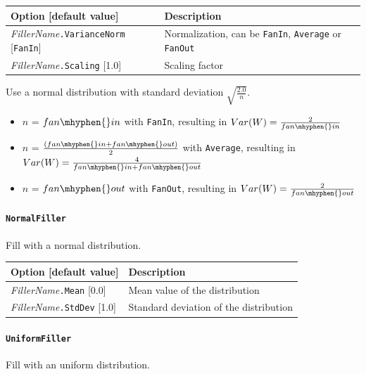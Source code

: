 \documentclass[a4paper,11pt,oneside]{article}
\newenvironment{myitemize}
{ \begin{itemize}
    \setlength{\itemsep}{0pt}
    \setlength{\parskip}{0pt}
    \setlength{\parsep}{0pt}     }
{ \end{itemize}                  }
\begin{document}
\begin{center}
 \begin{tabular}{| p{5cm} | p{10cm} | }
 \hline
 Option [default value] & Description\\
 \hline\hline
    \emph{FillerName}\lstinline!.VarianceNorm! [\lstinline!FanIn!]
    & Normalization, can be \lstinline!FanIn!, \lstinline!Average!
    or \lstinline!FanOut! \\
    \emph{FillerName}\lstinline!.Scaling! [1.0] & Scaling factor \\
 \hline
\end{tabular}
\end{center}

Use a normal distribution with standard deviation $\sqrt{\frac{2.0}{n}}$.

\begin{myitemize}
\item $n$ = $fan\mhyphen{}in$ with \lstinline!FanIn!, resulting in
$Var(W)=\frac{2}{fan\mhyphen{}in}$ \\
\item $n$ = $\frac{(fan\mhyphen{}in + fan\mhyphen{}out)}{2}$ with
\lstinline!Average!, resulting in
$Var(W)=\frac{4}{fan\mhyphen{}in + fan\mhyphen{}out}$ \\
\item $n$ = $fan\mhyphen{}out$ with \lstinline!FanOut!, resulting in
$Var(W)=\frac{2}{fan\mhyphen{}out}$
\end{myitemize}




\paragraph{\texorpdfstring{%
\lstinline[basicstyle=\ttfamily\bfseries]!NormalFiller!}{NormalFiller}}
Fill with a normal distribution.

\begin{center}
 \begin{tabular}{| p{5cm} | p{10cm} | }
 \hline
 Option [default value] & Description\\
 \hline\hline
    \emph{FillerName}\lstinline!.Mean! [0.0] & Mean value of the distribution \\
    \emph{FillerName}\lstinline!.StdDev! [1.0] & Standard deviation of the
    distribution \\
 \hline
\end{tabular}
\end{center}

\paragraph{\texorpdfstring{%
\lstinline[basicstyle=\ttfamily\bfseries]!UniformFiller!}{UniformFiller}}
Fill with an uniform distribution.
\end{document}

